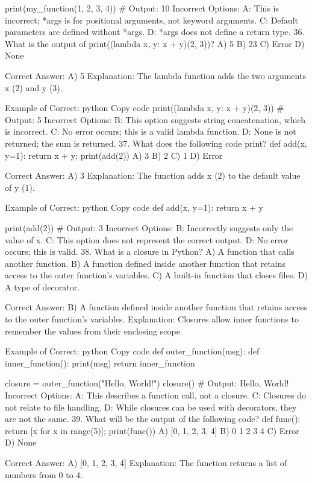   print(my_function(1, 2, 3, 4))  # Output: 10
Incorrect Options:
A: This is incorrect; *args is for positional arguments, not keyword arguments.
C: Default parameters are defined without *args.
D: *args does not define a return type.
36. What is the output of print((lambda x, y: x + y)(2, 3))?
A) 5
B) 23
C) Error
D) None

Correct Answer: A) 5
Explanation: The lambda function adds the two arguments x (2) and y (3).

Example of Correct:
python
Copy code
print((lambda x, y: x + y)(2, 3))  # Output: 5
Incorrect Options:
B: This option suggests string concatenation, which is incorrect.
C: No error occurs; this is a valid lambda function.
D: None is not returned; the sum is returned.
37. What does the following code print? def add(x, y=1): return x + y; print(add(2))
A) 3
B) 2
C) 1
D) Error

Correct Answer: A) 3
Explanation: The function adds x (2) to the default value of y (1).

Example of Correct:
python
Copy code
def add(x, y=1):
    return x + y

print(add(2))  # Output: 3
Incorrect Options:
B: Incorrectly suggests only the value of x.
C: This option does not represent the correct output.
D: No error occurs; this is valid.
38. What is a closure in Python?
A) A function that calls another function.
B) A function defined inside another function that retains access to the outer function's variables.
C) A built-in function that closes files.
D) A type of decorator.

Correct Answer: B) A function defined inside another function that retains access to the outer function's variables.
Explanation: Closures allow inner functions to remember the values from their enclosing scope.

Example of Correct:
python
Copy code
def outer_function(msg):
    def inner_function():
        print(msg)
    return inner_function

closure = outer_function("Hello, World!")
closure()  # Output: Hello, World!
Incorrect Options:
A: This describes a function call, not a closure.
C: Closures do not relate to file handling.
D: While closures can be used with decorators, they are not the same.
39. What will be the output of the following code? def func(): return [x for x in range(5)]; print(func())
A) [0, 1, 2, 3, 4]
B) 0 1 2 3 4
C) Error
D) None

Correct Answer: A) [0, 1, 2, 3, 4]
Explanation: The function returns a list of numbers from 0 to 4.

